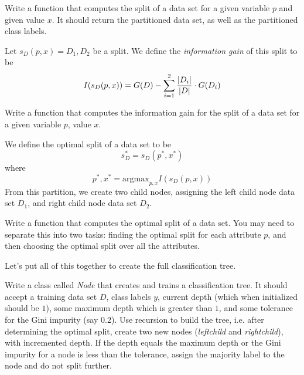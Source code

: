 \begin{problem}
Write a function that computes the split of a data set for a given variable $p$ and given value $x$. It should return the partitioned data set, as well as the partitioned class labels.
\end{problem}

\begin{definition}
Let $s_{D}(p,x) = D_{1},D_{2}$ be a split. We define the \emph{information gain} of this split to be 
\begin{equation*}
I(s_{D}(p,x)) = G(D) - \sum_{i=1}^{2} \frac{\left\lvert D_{i}\right\rvert}{\left\lvert D\right\rvert} \cdot G(D_{i})
\end{equation*}
\end{definition}

\begin{problem}
Write a function that computes the information gain for the split of a data set for a given variable $p$, value $x$.
\end{problem}

We define the optimal split of a data set to be
\begin{equation*}
s_{D}^{*} = s_{D}(p^{*}, x^{*})
\end{equation*}
where 
\begin{equation*}
p^{*}, x^{*} = \text{argmax}_{p,x} I(s_{D}(p,x))
\end{equation*}
From this partition, we create two child nodes, assigning the left child node data set $D_{1}$, and right child node data set $D_{2}$.

\begin{problem}
Write a function that computes the optimal split of a data set. You may need to separate this into two tasks: finding the optimal split for each attribute $p$, and then choosing the optimal split over all the attributes.
\end{problem}

Let's put all of this together to create the full classification tree.

\begin{problem}
Write a class called \emph{Node} that creates and trains a classification tree. It should accept a training data set $D$, class labels $y$, current depth (which when initialized should be $1$), some maximum depth which is greater than $1$, and some tolerance for the Gini impurity (say $0.2$). Use recursion to build the tree, i.e. after determining the optimal split, create two new nodes (\emph{leftchild} and \emph{rightchild}), with incremented depth. If the depth equals the maximum depth or the Gini impurity for a node is less than the tolerance, assign the majority label to the node and do not split further.
\end{problem}

